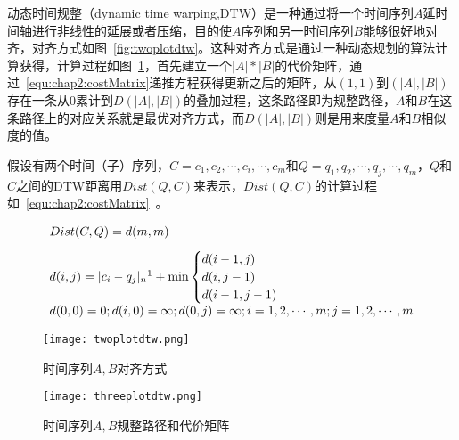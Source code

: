 


动态时间规整\cite{muller2007dynamic}（dynamic time warping,DTW）是一种通过将一个时间序列$A$延时间轴进行非线性的延展或者压缩，目的使$A$序列和另一时间序列$B$能够很好地对齐，对齐方式如图~\ref{fig:twoplotdtw}。这种对齐方式是通过一种动态规划的算法计算获得，计算过程如图~\ref{fig:threeplotdtw}，首先建立一个$|A|*|B|$的代价矩阵，通过~\ref{equ:chap2:costMatrix}递推方程获得更新之后的矩阵，从$(1,1)$到$(|A|,|B|)$存在一条从$0$累计到$D(|A|,|B|)$的叠加过程，这条路径即为规整路径，$A$和$B$在这条路径上的对应关系就是最优对齐方式，而$D(|A|,|B|)$则是用来度量$A$和$B$相似度的值。


假设有两个时间（子）序列，$C=c_1,c_2,\cdots,c_i,\cdots,c_m$和$Q=q_1,q_2,\cdots,q_j,\cdots,q_m$，$Q$和$C$之间的DTW距离用$Dist(Q,C)$来表示，$Dist(Q,C)$的计算过程如~\ref{equ:chap2:costMatrix}~\cite{sart2010accelerating}。

\begin{equation}
\label{equ:chap2:costMatrix}
\begin{array}{l}
Dist(C,Q) = d(m,m) \\ [0.3cm]
d(i,j) = |c_i-q_j|_n\footnote{n=1,2} + \min
\begin{cases}
d(i-1,j)\\
d(i,j-1)\\
d(i-1,j-1)
\end{cases}\\[0.2cm]
d(0,0)=0;d(i,0)=\infty;d(0,j)=\infty;i=1,2,\cdots,m;j=1,2,\cdots,m 
\end{array}
\end{equation}


\begin{figure}
	\begin{minipage}{0.48\textwidth}
		\centering
		\texttt{[image: twoplotdtw.png]}
		\caption{时间序列$A,B$对齐方式}
		\label{fig:twoplotdtw}
	\end{minipage}\hfill
	\begin{minipage}{0.48\textwidth}
	\centering
	\texttt{[image: threeplotdtw.png]}
	\caption{时间序列$A,B$规整路径和代价矩阵}
	\label{fig:threeplotdtw}
	\end{minipage}
\end{figure}

